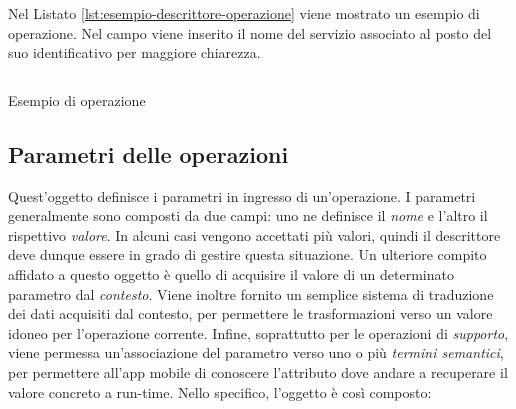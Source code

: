 Nel Listato \ref{lst:esempio-descrittore-operazione} viene mostrato un esempio di operazione. Nel campo  viene inserito il nome del servizio associato al posto del suo identificativo per maggiore chiarezza.

\begin{listing}[H]
	\inputminted{json}{5-implementazione-backend/Codice/esempio_descrittore_operazione.json}
	\caption{Esempio di operazione}
	\label{lst:esempio-descrittore-operazione}
\end{listing}

\subsection{Parametri delle operazioni\label{sec:descrittore-parametri}}

Quest'oggetto definisce i parametri in ingresso di un'operazione. I parametri generalmente sono composti da due campi: uno ne definisce il \emph{nome} e l'altro il rispettivo \emph{valore}. In alcuni casi vengono accettati più valori, quindi il descrittore deve dunque essere in grado di gestire questa situazione. Un ulteriore compito affidato a questo oggetto è quello di acquisire il valore di un determinato parametro dal \emph{contesto}. Viene inoltre fornito un semplice sistema di traduzione dei dati acquisiti dal contesto, per permettere le trasformazioni verso un valore idoneo per l'operazione corrente. Infine, soprattutto per le operazioni di \emph{supporto}, viene permessa un'associazione del parametro verso uno o più \emph{termini semantici}, per permettere all'app mobile di conoscere l'attributo dove andare a recuperare il valore concreto a run-time. Nello specifico, l'oggetto è così composto:

